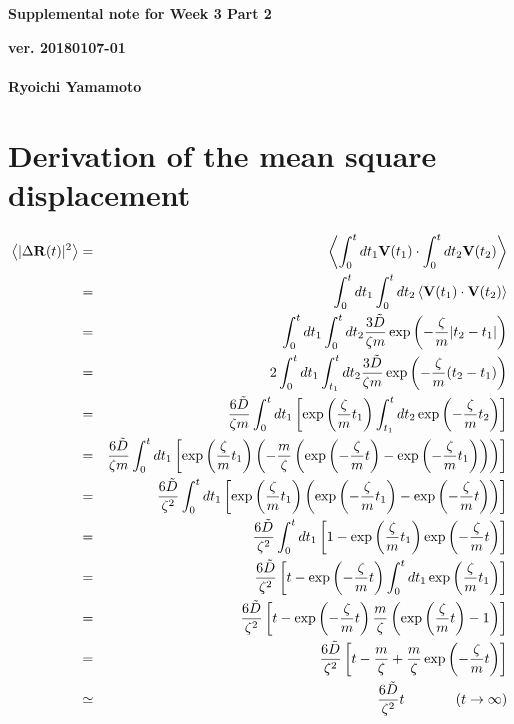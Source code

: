 \documentclass[a4paper,11pt]{article}
\begin{document}
\begin{center}
  {\LARGE\bf Supplemental note for Week 3 Part 2}
  \end{center}
\begin{flushright}
  {\large\bf ver. 20180107-01}\\
 \ \\
{\large\bf Ryoichi Yamamoto}\\
\end{flushright}

\section{Derivation of the mean square displacement}

\begin{eqnarray}
\left\langle |\Delta {\bf R}(t)|^2\right\rangle 
&=& \left\langle\int_{0}^{t}d t_1 {\bf V}(t_1)\cdot\int_{0}^{t}d t_2  {\bf V}(t_2)\right\rangle \\
&=& \int_{0}^{t}d t_1 \int_{0}^{t}d t_2 \left\langle{\bf V}(t_1)\cdot {\bf V}(t_2)\right\rangle \\
&=&
\int_{0}^{t}d t_1 \int_{0}^{t}d t_2 
\frac{3\tilde{D}}{\zeta m} \exp\left(-\frac{\zeta}{m}|t_2-t_1|\right)\\
&=&2
\int_{0}^{t}d t_1 \int_{t_1}^{t}d t_2 
\frac{3\tilde{D}}{\zeta m} \exp\left(-\frac{\zeta}{m}(t_2-t_1)\right)\\
&=&\frac{6\tilde{D}}{\zeta m}
\int_{0}^{t}d t_1 \left[ \exp\left(\frac{\zeta}{m}t_1\right)
\int_{t_1}^{t}d t_2 \exp\left(-\frac{\zeta}{m}t_2\right)\right]\\
&=&\frac{6\tilde{D}}{\zeta m}
\int_{0}^{t}d t_1
\left[
\exp
\left(\frac{\zeta}{m}t_1\right)
\left(-\frac{m}{\zeta}\left(
\exp\left(-\frac{\zeta}{m}t\right)
-\exp\left(-\frac{\zeta}{m}t_1\right)
\right)
\right)
\right]\\
&=&\frac{6\tilde{D}}{\zeta^2}
\int_{0}^{t}d t_1
\left[
\exp
\left(\frac{\zeta}{m}t_1\right)
\left(
\exp\left(-\frac{\zeta}{m}t_1\right)
-\exp\left(-\frac{\zeta}{m}t\right)
\right)
\right]
\\
&=&\frac{6\tilde{D}}{\zeta^2}
\int_{0}^{t}d t_1
\left[
1-
\exp
\left(\frac{\zeta}{m}t_1\right)
\exp\left(-\frac{\zeta}{m}t\right)
\right]
\\
&=&\frac{6\tilde{D}}{\zeta^2}
\left[
t-
\exp
\left(-\frac{\zeta}{m}t\right)
\int_{0}^{t}d t_1
\exp\left(\frac{\zeta}{m}t_1\right)
\right]
\\
&=&\frac{6\tilde{D}}{\zeta^2}
\left[
t-
\exp
\left(-\frac{\zeta}{m}t\right)
\frac{m}{\zeta}
\left(
\exp\left(\frac{\zeta}{m}t\right)-1\right)
\right]
\\
&=&\frac{6\tilde{D}}{\zeta^2}
\left[
t-\frac{m}{\zeta}+\frac{m}{\zeta}\exp\left(-\frac{\zeta}{m}t\right)
\right]
\\
&\simeq&
\frac{6\tilde{D}}{\zeta^2}t\ \ \ \ \ \ \ \ \ \ \ (t\rightarrow\infty)
\end{eqnarray}
\end{document}
